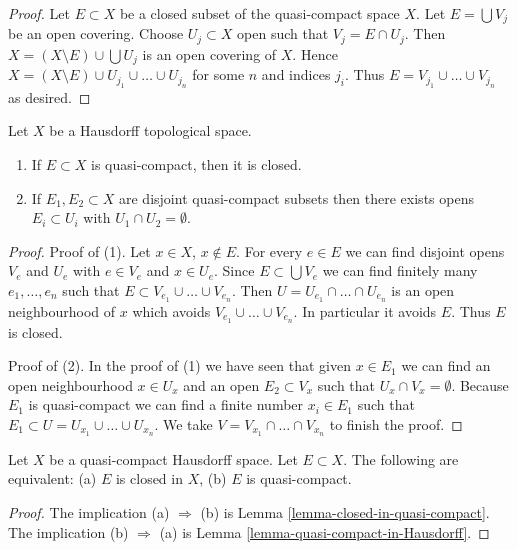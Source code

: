 \begin{proof}
Let $E \subset X$ be a closed subset of the quasi-compact space $X$.
Let $E = \bigcup V_j$ be an open covering. Choose $U_j \subset X$
open such that $V_j = E \cap U_j$. Then $X = (X \setminus E) \cup \bigcup U_j$
is an open covering of $X$. Hence
$X = (X \setminus E) \cup U_{j_1} \cup \ldots \cup U_{j_n}$ for some
$n$ and indices $j_i$. Thus $E = V_{j_1} \cup \ldots \cup V_{j_n}$
as desired.
\end{proof}

\begin{lemma}
\label{lemma-quasi-compact-in-Hausdorff}
Let $X$ be a Hausdorff topological space.
\begin{enumerate}
\item If $E \subset X$ is quasi-compact, then it is closed.
\item If $E_1, E_2 \subset X$ are disjoint quasi-compact subsets
then there exists opens $E_i \subset U_i$ with $U_1 \cap U_2 = \emptyset$.
\end{enumerate}
\end{lemma}

\begin{proof}
Proof of (1). Let $x \in X$, $x \not \in E$.
For every $e \in E$ we can find disjoint opens $V_e$ and $U_e$
with $e \in V_e$ and $x \in U_e$. Since $E \subset \bigcup V_e$
we can find finitely many $e_1, \ldots, e_n$ such that
$E \subset V_{e_1} \cup \ldots \cup V_{e_n}$. Then
$U = U_{e_1} \cap \ldots \cap U_{e_n}$ is an open neighbourhood
of $x$ which avoids $V_{e_1} \cup \dots \cup V_{e_n}$. In particular
it avoids $E$. Thus $E$ is closed.

\medskip\noindent
Proof of (2). In the proof of (1) we have seen that given $x \in E_1$
we can find an open neighbourhood $x \in U_x$ and an open
$E_2 \subset V_x$ such that $U_x \cap V_x = \emptyset$. Because
$E_1$ is quasi-compact we can find a finite number $x_i \in E_1$
such that $E_1 \subset U = U_{x_1} \cup \ldots \cup U_{x_n}$.
We take $V = V_{x_1} \cap \ldots \cap V_{x_n}$ to finish the proof.
\end{proof}

\begin{lemma}
\label{lemma-closed-in-compact}
Let $X$ be a quasi-compact Hausdorff space. Let $E \subset X$.
The following are equivalent: (a) $E$ is closed in $X$, (b)
$E$ is quasi-compact.
\end{lemma}

\begin{proof}
The implication (a) $\Rightarrow$ (b) is
Lemma \ref{lemma-closed-in-quasi-compact}.
The implication (b) $\Rightarrow$ (a) is
Lemma \ref{lemma-quasi-compact-in-Hausdorff}.
\end{proof}

